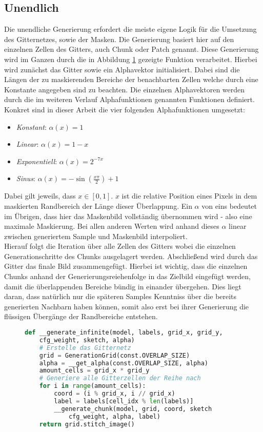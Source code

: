 \subsection {Unendlich}

Die unendliche Generierung erfordert die meiste eigene Logik für die Umsetzung des Gitternetzes, sowie der Masken. Die Generierung basiert hier auf den einzelnen Zellen des Gitters, auch Chunk oder Patch genannt. Diese Generierung wird im Ganzen durch die in Abbildung \ref{fig:gen_infinite} gezeigte Funktion verarbeitet. Hierbei wird zunächst das Gitter sowie ein Alphavektor initialisiert. Dabei sind die Längen der zu maskierenden Bereiche der benachbarten Zellen welche durch eine Konstante angegeben sind zu beachten. Die einzelnen Alphavektoren werden durch die im weiteren Verlauf Alphafunktionen genannten Funktionen definiert. Konkret sind in dieser Arbeit die vier folgenden Alphafunktionen umgesetzt: 
\begin{itemize}
    \item \textit{Konstant}: $\alpha(x) = 1$
    \item \textit{Linear}: $\alpha(x) = 1 - x$
    \item \textit{Exponentiell}: $\alpha(x) = 2^{-7x}$
    \item \textit{Sinus}: $\alpha(x) = -\sin(\frac{x\pi}{2}) + 1$
\end{itemize}
Dabei gilt jeweils, dass $x \in [0,1]$. $x$ ist die relative Position eines Pixels in dem maskierten Randbereich der Länge dieser Überlappung. Ein $\alpha$ von eins bedeutet im Übrigen, dass hier das Maskenbild vollständig übernommen wird - also eine maximale Maskierung. Bei allen anderen Werten wird anhand dieses $\alpha$ linear zwischen generiertem Sample und Maskenbild interpoliert. \\
Hierauf folgt die Iteration über alle Zellen des Gitters wobei die einzelnen Generationschritte des Chunks ausgelagert werden. Abschließend wird durch das Gitter das finale Bild zusammengefügt. Hierbei ist wichtig, dass die einzelnen Chunks anhand der Generierungsreiehenfolge in das Zielbild eingefügt werden, damit die überlappenden Bereiche bündig in einander übergehen. Dies liegt daran, dass natürlich nur die späteren Samples Kenntniss über die bereits generierten Nachbarn haben können, somit also erst bei ihrer Generierung die flüssigen Übergänge der Randbereiche entstehen. 
\begin{figure}[htbp]
\begin{lstlisting}[language=python]
def __generate_infinite(model, labels, grid_x, grid_y,
    cfg_weight, sketch, alpha)
    # Erstelle das Gitternetz
    grid = GenerationGrid(const.OVERLAP_SIZE)
    alpha = __get_alpha(const.OVERLAP_SIZE, alpha)
    amount_cells = grid_x * grid_y
    # Generiere alle Gitterzellen der Reihe nach
    for i in range(amount_cells):
        coord = (i % grid_x, i // grid_x)
        label = labels[cell_idx % len(labels)]
        __generate_chunk(model, grid, coord, sketch
            cfg_weight, alpha, label)
    return grid.stitch_image()
\end{lstlisting}
    \captionsetup{type=figure}
    \label{fig:gen_infinite}
\end{figure} \\

